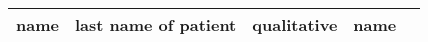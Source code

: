 \documentclass[a4paper,12pt]{article}
\begin{document}
\begin{adjustbox}{width=1\textwidth}
\begin{tabular}{|l|l|l|l|l|}
name          & last name of patient                                           & qualitative   & name                                                                                                                                                                                                                                                           &                     \\ \hline
\end{tabular}

\end{adjustbox}
\end{document}
